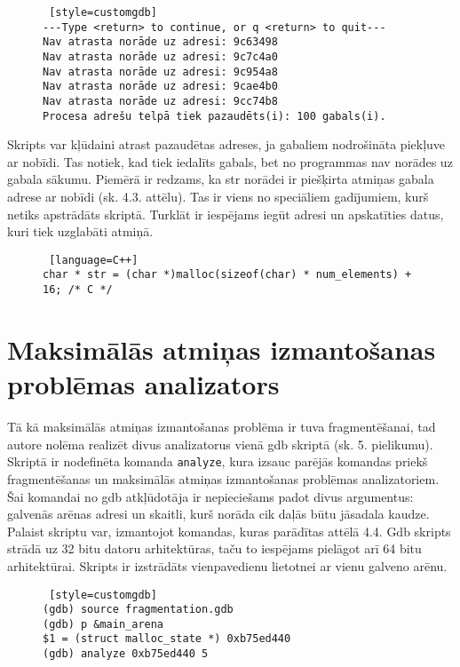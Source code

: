 \begin{figure}[h]
\begin{lstlisting} [style=customgdb]
---Type <return> to continue, or q <return> to quit---
Nav atrasta norāde uz adresi: 9c63498
Nav atrasta norāde uz adresi: 9c7c4a0
Nav atrasta norāde uz adresi: 9c954a8
Nav atrasta norāde uz adresi: 9cae4b0
Nav atrasta norāde uz adresi: 9cc74b8
Procesa adrešu telpā tiek pazaudēts(i): 100 gabals(i).
\end{lstlisting}
\caption{\textbf{\fontsize{11}{12}\selectfont {Atmiņas noplūdes atrašana, gdb skripta izvads}}}
\end{figure} %

Skripts var kļūdaini atrast pazaudētas adreses, ja gabaliem nodrošināta piekļuve ar nobīdi.
Tas notiek, kad tiek iedalīts gabals, bet no programmas nav norādes uz gabala sākumu.
Piemērā ir redzams, ka str norādei ir piešķirta atmiņas gabala adrese ar nobīdi (sk. 4.3. attēlu).
Tas ir viens no speciāliem gadījumiem, kurš netiks apstrādāts skriptā. 
Turklāt ir iespējams iegūt adresi un apskatīties datus, kuri tiek uzglabāti atmiņā.
\begin{figure}[h]
\begin{lstlisting} [language=C++]
char * str = (char *)malloc(sizeof(char) * num_elements) + 16; /* C */
\end{lstlisting}
\caption{\textbf{\fontsize{11}{12}\selectfont {Speciālgadījums, no procesa adrešu telpā nav norādes uz gabala sākumu}}}
\end{figure}

\section{Maksimālās atmiņas izmantošanas problēmas analizators}
Tā kā maksimālās atmiņas izmantošanas problēma ir tuva fragmentēšanai, tad autore nolēma realizēt divus analizatorus vienā gdb skriptā (sk. 5. pielikumu).
Skriptā ir nodefinēta komanda \texttt{analyze}, kura izsauc parējās komandas priekš fragmentēšanas un maksimālās atmiņas izmantošanas problēmas analizatoriem.
Šai komandai no gdb atkļūdotāja ir nepieciešams padot divus argumentus: galvenās arēnas adresi un skaitli, kurš norāda cik daļās būtu jāsadala kaudze.
Palaist skriptu var, izmantojot komandas, kuras parādītas attēlā 4.4.
Gdb skripts strādā uz 32 bitu datoru arhitektūras, taču to iespējams pielāgot arī 64 bitu arhitektūrai.
Skripts ir izstrādāts vienpavedienu lietotnei ar vienu galveno arēnu.

\begin{figure}[h]
\begin{lstlisting} [style=customgdb]
(gdb) source fragmentation.gdb
(gdb) p &main_arena
$1 = (struct malloc_state *) 0xb75ed440
(gdb) analyze 0xb75ed440 5
\end{lstlisting}
\caption{\textbf{\fontsize{11}{12}\selectfont {Gdb skripta palaišana}}}
\end{figure} %


